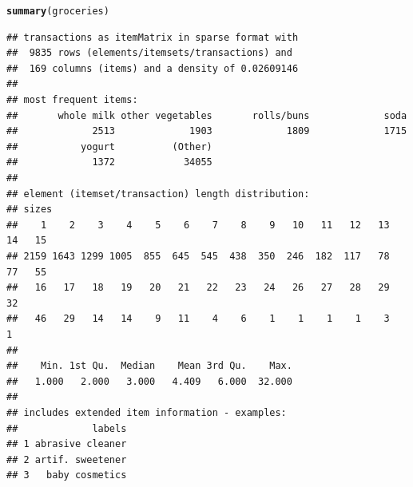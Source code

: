 \documentclass{article}\usepackage[]{graphicx}\usepackage[]{color}
\makeatletter
\newcommand{\hlstd}[1]{\textcolor[rgb]{0.345,0.345,0.345}{#1}}%
\newcommand{\hlkwd}[1]{\textcolor[rgb]{0.737,0.353,0.396}{\textbf{#1}}}%
\newenvironment{kframe}{%
 \def\at@end@of@kframe{}%
 \ifinner\ifhmode%
  \def\at@end@of@kframe{\end{minipage}}%
  \begin{minipage}{\columnwidth}%
 \fi\fi%
 \def\FrameCommand##1{\hskip\@totalleftmargin \hskip-\fboxsep
 \colorbox{shadecolor}{##1}\hskip-\fboxsep
     \hskip-\linewidth \hskip-\@totalleftmargin \hskip\columnwidth}%
 \MakeFramed {\advance\hsize-\width
   \@totalleftmargin\z@ \linewidth\hsize
   \@setminipage}}%
 {\par\unskip\endMakeFramed%
 \at@end@of@kframe}
\newenvironment{knitrout}{}{} %
\makeatother
\begin{document}
\begin{knitrout}
\color{fgcolor}\begin{kframe}
\begin{alltt}
\hlkwd{summary}\hlstd{(groceries)}
\end{alltt}
\begin{verbatim}
## transactions as itemMatrix in sparse format with
##  9835 rows (elements/itemsets/transactions) and
##  169 columns (items) and a density of 0.02609146 
## 
## most frequent items:
##       whole milk other vegetables       rolls/buns             soda 
##             2513             1903             1809             1715 
##           yogurt          (Other) 
##             1372            34055 
## 
## element (itemset/transaction) length distribution:
## sizes
##    1    2    3    4    5    6    7    8    9   10   11   12   13   14   15 
## 2159 1643 1299 1005  855  645  545  438  350  246  182  117   78   77   55 
##   16   17   18   19   20   21   22   23   24   26   27   28   29   32 
##   46   29   14   14    9   11    4    6    1    1    1    1    3    1 
## 
##    Min. 1st Qu.  Median    Mean 3rd Qu.    Max. 
##   1.000   2.000   3.000   4.409   6.000  32.000 
## 
## includes extended item information - examples:
##             labels
## 1 abrasive cleaner
## 2 artif. sweetener
## 3   baby cosmetics
\end{verbatim}
\end{kframe}
\end{knitrout}
\end{document}
